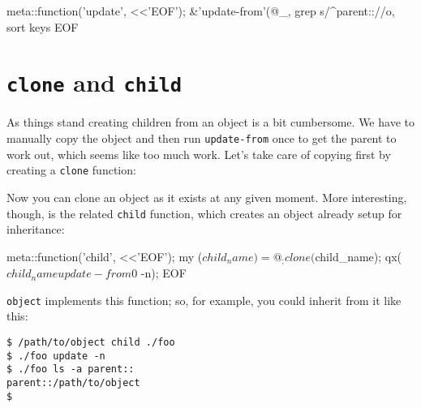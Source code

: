 \documentclass{report}
\begin{document}
\begin{perlcode}
meta::function('update', <<'EOF');
&{'update-from'}(@_, grep s/^parent:://o, sort keys %
EOF \end{perlcode}

\section{{\tt clone} and {\tt child}}\label{sec:cloning-and-inheritance-clone-and-child}
    As things stand creating children from an object is a bit cumbersome. We have to manually copy the object and then run {\tt update-from} once to get the parent to work out, which seems
    like too much work. Let's take care of copying first by creating a {\tt clone} function:


    Now you can clone an object as it exists at any given moment. More interesting, though, is the related {\tt child} function, which creates an object already setup for inheritance:

\begin{perlcode}
meta::function('child', <<'EOF');
my ($child_name) = @_;
clone($child_name);
qx($child_name update-from $0 -n);
EOF \end{perlcode}

    {\tt object} implements this function; so, for example, you could inherit from it like this:

\begin{verbatim}
$ /path/to/object child ./foo
$ ./foo update -n
$ ./foo ls -a parent::
parent::/path/to/object
$
\end{verbatim}
\end{document}
